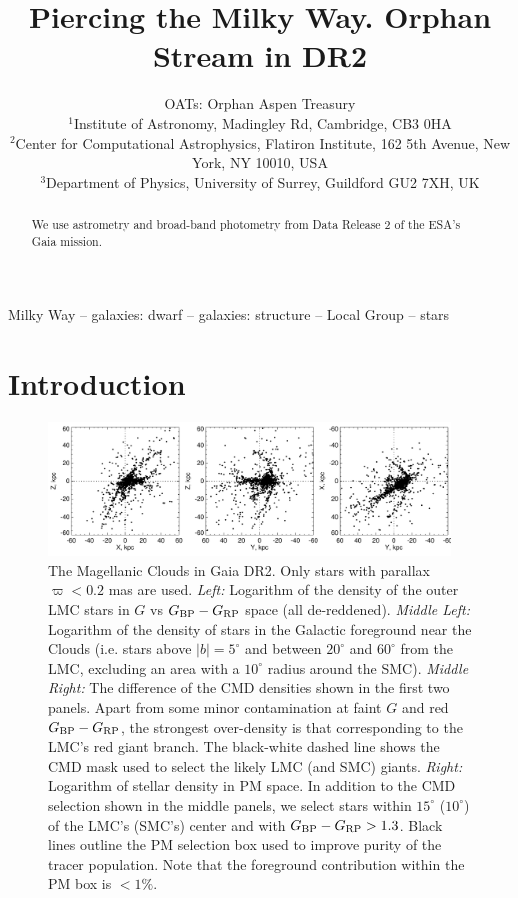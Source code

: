\documentclass[a4paper,useAMS,usenatbib]{mnras}
\title[Orphan Stream in \gaia DR2]{Piercing the Milky Way. Orphan
  Stream in \gaia DR2}
\author[OATs]{OATs: Orphan Aspen Treasury\\
  $^{1}$Institute of Astronomy, Madingley Rd, Cambridge, CB3 0HA\\
  $^{2}$Center for Computational Astrophysics, Flatiron Institute, 162 5th Avenue, New York, NY 10010, USA\\
  $^{3}$Department of Physics, University of Surrey, Guildford GU2 7XH, UK\\
}
\begin{document}
\maketitle

\label{firstpage}

\begin{abstract}
We use astrometry and broad-band photometry from Data Release 2 of the
ESA's Gaia mission.

\end{abstract}

\begin{keywords}
Milky Way -- galaxies: dwarf -- galaxies: structure -- Local Group -- stars
\end{keywords}

\section{Introduction}



%
\begin{figure}
  \centering
  \includegraphics[width=0.95\textwidth]{orphan_paper_xyz.pdf}
  \caption[]{The Magellanic Clouds in Gaia DR2. Only stars with
    parallax $\varpi<0.2$ mas are used. {\it Left:} Logarithm of the
    density of the outer LMC stars in $G$ vs $G_{\rm BP}-G_{\rm RP}$
    space (all de-reddened). {\it Middle Left:} Logarithm of the
    density of stars in the Galactic foreground near the Clouds
    (i.e. stars above $|b|=5^{\circ}$ and between $20^{\circ}$ and
    $60^{\circ}$ from the LMC, excluding an area with a $10^{\circ}$
    radius around the SMC). {\it Middle Right:} The difference of the
    CMD densities shown in the first two panels. Apart from some minor
    contamination at faint $G$ and red $G_{\rm BP}-G_{\rm RP}$, the
    strongest over-density is that corresponding to the LMC's red
    giant branch. The black-white dashed line shows the CMD mask used
    to select the likely LMC (and SMC) giants. {\it Right:} Logarithm
    of stellar density in PM space. In addition to the CMD selection
    shown in the middle panels, we select stars within $15^{\circ}$
    ($10^{\circ}$) of the LMC's (SMC's) center and with $G_{\rm
      BP}-G_{\rm RP} > 1.3$. Black lines outline the PM selection box
    used to improve purity of the tracer population. Note that the
    foreground contribution within the PM box is $<1\%$.}
   \label{fig:xyzgdr2}
\end{figure}
%
\end{document}
